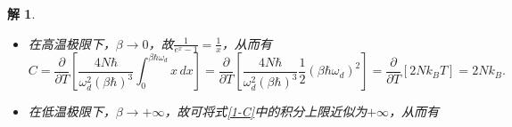 \documentclass[UTF8,10pt,a4paper]{article}
\theoremstyle{Problem}
\theoremstyle{Solution}
\newtheorem*{sol}{解}
\begin{document}
\begin{sol}
\begin{itemize}
        其中$N$为二维固体中的原子数，$n=\frac{N}{L^2}$为二维固体中的原子数密度，二维固体的德拜温度$\omega_d$满足$\omega_d^2=4\pi nv^2$.
        由于二维固体由$N$个自由度为$2$的原子组成，故有$2N$个振动模式，声子的态密度函数满足
        \begin{equation}
            \int_0^{\omega_{\text{cutoff}}}g(\omega)d\omega=\frac{2N\omega_{\text{cutoff}}^2}{\omega_d^2}=2N.
        \end{equation}
        故声子的频率上限即为德拜频率
        \begin{equation}
            \omega_{\text{cutoff}}=\omega_d.
        \end{equation}
        声子的状态服从玻色分布：
        \begin{equation}
            n(\omega)=\frac{1}{e^{\beta\hbar\omega}-1}.
        \end{equation}
        故二维固体的内能为
        \begin{equation}
            U=\frac{4N\hbar}{\omega_d^2}\int_0^{\omega_d}\frac{\omega^2\,d\omega}{e^{\beta\hbar\omega}-1}+U_0,
        \end{equation}
        其中$U_0$为温度$T=0$时二维固体的内能，它与$T$无关. 令$x=\beta\hbar\omega$，上式可化为
        \begin{equation}
            U=\frac{4N\hbar}{\omega_d^2(\beta\hbar)^3}\int_0^{\beta\hbar\omega_d}\frac{x^2\,dx}{e^x-1}+U_0.
        \end{equation}
        二维固体的热容为
        \begin{equation}
            \label{1-C}
            C=\frac{\partial U}{\partial T}=\frac{\partial}{\partial T}\left[\frac{4N\hbar}{\omega_d^2(\beta\hbar)^3}\int_0^{\beta\hbar\omega_d}\frac{x^2\,dx}{e^x-1}\right].
        \end{equation}
        \item[$\triangleright$] 在高温极限下，$\beta\rightarrow 0$，故$\frac{1}{e^x-1}=\frac{1}{x}$，从而有
        \begin{equation}
            C=\frac{\partial}{\partial T}\left[\frac{4N\hbar}{\omega_d^2(\beta\hbar)^3}\int_0^{\beta\hbar\omega_d}x\,dx\right]=\frac{\partial}{\partial T}\left[\frac{4N\hbar}{\omega_d^2(\beta\hbar)^3}\frac{1}{2}(\beta\hbar\omega_d)^2\right]=\frac{\partial}{\partial T}[2Nk_BT]=2Nk_B.
        \end{equation}
        \item[$\triangleright$] 在低温极限下，$\beta\rightarrow+\infty$，故可将式\eqref{1-C}中的积分上限近似为$+\infty$，从而有
        \begin{align}

\end{align}
\end{itemize}
\end{sol}
\end{document}
